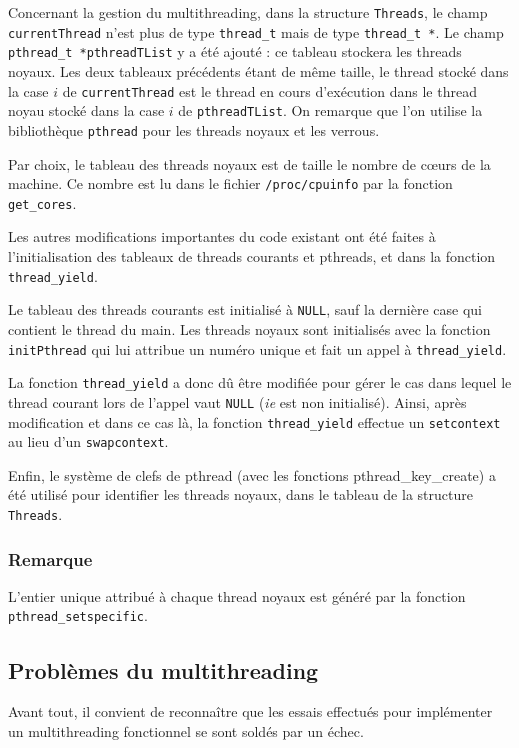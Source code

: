 \documentclass[a4paper,11pt]{article}
\begin{document}
Concernant la gestion du multithreading, dans la structure \texttt{Threads}, le champ \texttt{currentThread} n'est plus de type \texttt{thread\_t} mais de type \texttt{thread\_t *}. Le champ \texttt{pthread\_t *pthreadTList} y a été ajouté : ce tableau stockera les threads noyaux. Les deux tableaux précédents étant de même taille, le thread stocké dans la case $i$ de \texttt{currentThread} est le thread en cours d'exécution dans le thread noyau stocké dans la case $i$ de \texttt{pthreadTList}. On remarque que l'on utilise la bibliothèque \texttt{pthread} pour les threads noyaux et les verrous.

Par choix, le tableau des threads noyaux est de taille le nombre de c\oe urs de la machine. Ce nombre est lu dans le fichier \texttt{/proc/cpuinfo} par la fonction \texttt{get\_cores}.

Les autres modifications importantes du code existant ont été faites à l'initialisation des tableaux de threads courants et pthreads, et dans la fonction \texttt{thread\_yield}.

Le tableau des threads courants est initialisé à \texttt{NULL}, sauf la dernière case qui contient le thread du main. Les threads noyaux sont initialisés avec la fonction \texttt{initPthread} qui lui attribue un numéro unique et fait un appel à \texttt{thread\_yield}.

La fonction \texttt{thread\_yield} a donc dû être modifiée pour gérer le cas dans lequel le thread courant lors de l'appel vaut \texttt{NULL} (\textit{ie} est non initialisé). Ainsi, après modification et dans ce cas là, la fonction \texttt{thread\_yield} effectue un \texttt{setcontext} au lieu d'un \texttt{swapcontext}.

Enfin, le système de clefs de pthread (avec les fonctions pthread\_key\_create) a été utilisé pour identifier les threads noyaux,
dans le tableau de la structure \texttt{Threads}.

\subsubsection*{Remarque}

L'entier unique attribué à chaque thread noyaux est généré par la fonction \texttt{pthread\_setspecific}.

\subsection{Problèmes du multithreading}

Avant tout, il convient de reconnaître que les essais effectués pour implémenter un multithreading
fonctionnel se sont soldés par un échec.
\end{document}
